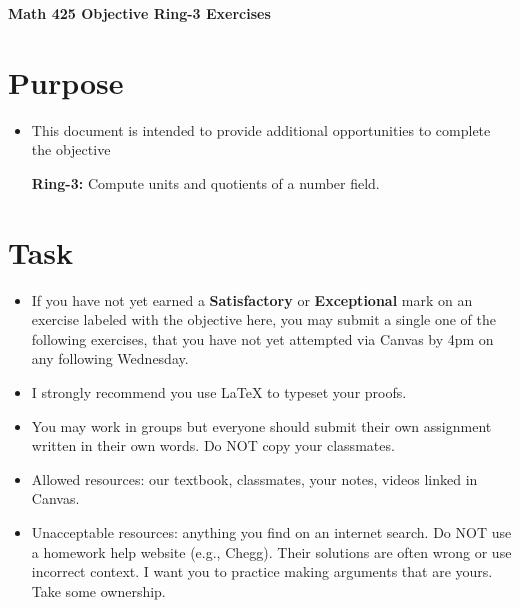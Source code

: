 \documentclass[12pt]{article}
\begin{document}
	\begin{center}
		{\Large \bf Math 425 Objective Ring-3 Exercises}
	\end{center}
	\section*{Purpose}
	\begin{itemize}
		\item This document is intended to provide additional opportunities to complete the objective
		
		\textbf{Ring-3:} Compute units and quotients of a number field.
	\end{itemize}
	\section*{Task}
	\begin{itemize}
		\item If you have not yet earned a \textbf{Satisfactory} or \textbf{Exceptional} mark on an exercise labeled with the objective here, you may submit a single one of the following exercises, that you have not yet attempted via Canvas by 4pm on any following Wednesday.
		\item I strongly recommend you use LaTeX to typeset your proofs.
		\item You may work in groups but everyone should submit their own assignment written in their own words.  Do NOT copy your classmates.
		\item Allowed resources: our textbook, classmates, your notes, videos linked in Canvas.
		\item Unacceptable resources: anything you find on an internet search. Do NOT use a homework help website (e.g., Chegg). Their solutions are often wrong or use incorrect context.  I want you to practice making arguments that are yours. Take some ownership.
	\end{itemize}
\end{document}
